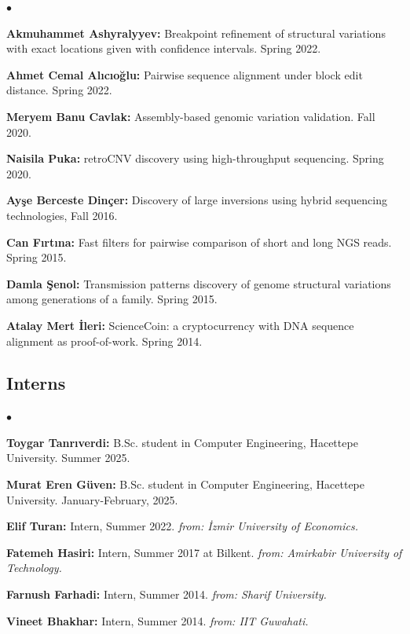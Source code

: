 \documentclass[margin,line]{res}
\newenvironment{list2}{
  \begin{list}{$\bullet$}{%
      \setlength{\itemsep}{0.1cm}
      \setlength{\parsep}{0in} \setlength{\parskip}{0in}
      \setlength{\topsep}{0in} \setlength{\partopsep}{0in} 
      \setlength{\leftmargin}{0.2in}}}{\end{list}}
\begin{document}
\begin{resume}
\begin{list2}
 \item \textbf{Akmuhammet Ashyralyyev:} Breakpoint refinement of structural variations with exact locations given with confidence intervals. Spring 2022.
 \item \textbf{Ahmet Cemal Alıcıoğlu:} Pairwise sequence alignment under block edit distance. Spring 2022.
\item 
  {\bf Meryem Banu Cavlak:} Assembly-based genomic variation validation. Fall 2020.
  \item
    {\bf Naisila Puka:} retroCNV discovery using high-throughput sequencing. Spring 2020.
  \item
    {\bf Ayşe Berceste Dinçer:} Discovery of large inversions using hybrid sequencing technologies, Fall 2016.
  \item
    {\bf Can Fırtına:} Fast filters for pairwise comparison of short and long NGS reads. Spring 2015.

  \item
    {\bf Damla Şenol:} Transmission patterns discovery of genome structural variations among generations of a family. Spring 2015.
  \item
    {\bf Atalay Mert İleri:} ScienceCoin: a cryptocurrency with DNA sequence alignment as proof-of-work. Spring 2014.
  \end{list2}
\vspace*{-.4cm}
\subsection{\small \sc Interns}
\begin{list2}
\item 
    \textbf{Toygar Tanrıverdi:} B.Sc. student in Computer Engineering,  Hacettepe University. Summer 2025.
\item 
    \textbf{Murat Eren Güven:} B.Sc. student in Computer Engineering,  Hacettepe University. January-February, 2025.
\item
  {\bf Elif Turan:} Intern, Summer 2022. \textit{from: İzmir University of Economics. }
\item
  {\bf Fatemeh Hasiri:} Intern, Summer 2017 at Bilkent. \textit{from: Amirkabir University of Technology.} %
\item
  {\bf Farnush Farhadi:} Intern, Summer 2014. \textit{from: Sharif University.}
\item
  {\bf Vineet Bhakhar:} Intern, Summer 2014.  \textit{from: IIT Guwahati.}
\end{list2}


\end{resume}
\end{document}
